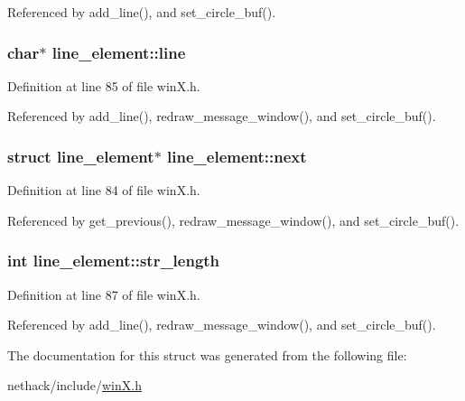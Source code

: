 Referenced by add\+\_\+line(), and set\+\_\+circle\+\_\+buf().

\hypertarget{structline__element_a684c95e23c7d50d2f2152c82c137d66b}{
\subsubsection[{line}]{\setlength{\rightskip}{0pt plus 5cm}char$\ast$ line\+\_\+element\+::line}}\label{structline__element_a684c95e23c7d50d2f2152c82c137d66b}


Definition at line 85 of file win\+X.\+h.



Referenced by add\+\_\+line(), redraw\+\_\+message\+\_\+window(), and set\+\_\+circle\+\_\+buf().

\hypertarget{structline__element_a1cdd40d4dd6f8b3fe87bd77df90afbaf}{
\subsubsection[{next}]{\setlength{\rightskip}{0pt plus 5cm}struct {\bf line\+\_\+element}$\ast$ line\+\_\+element\+::next}}\label{structline__element_a1cdd40d4dd6f8b3fe87bd77df90afbaf}


Definition at line 84 of file win\+X.\+h.



Referenced by get\+\_\+previous(), redraw\+\_\+message\+\_\+window(), and set\+\_\+circle\+\_\+buf().

\hypertarget{structline__element_a6d24c9bca6243e9975bb8150ab0865e5}{
\subsubsection[{str\+\_\+length}]{\setlength{\rightskip}{0pt plus 5cm}int line\+\_\+element\+::str\+\_\+length}}\label{structline__element_a6d24c9bca6243e9975bb8150ab0865e5}


Definition at line 87 of file win\+X.\+h.



Referenced by add\+\_\+line(), redraw\+\_\+message\+\_\+window(), and set\+\_\+circle\+\_\+buf().



The documentation for this struct was generated from the following file\+:\begin{DoxyCompactItemize}
\item 
nethack/include/\hyperlink{winX_8h}{win\+X.\+h}\end{DoxyCompactItemize}
